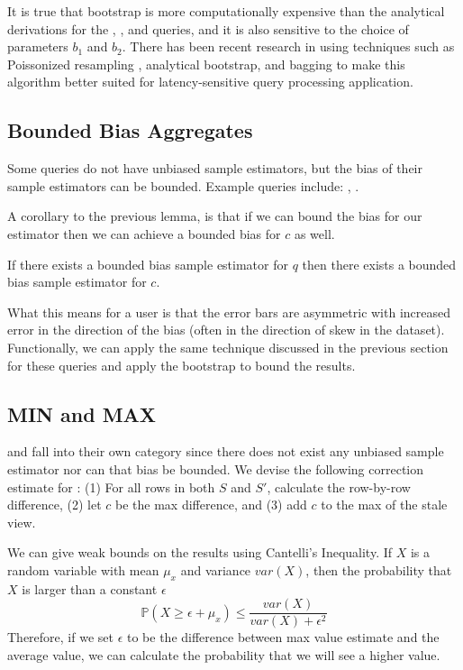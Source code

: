 It is true that bootstrap is more computationally expensive than the analytical derivations for the \sumfunc, \countfunc, and \avgfunc queries, and it is also sensitive to the choice of parameters $b_1$ and $b_2$.
There has been recent research in using techniques such as Poissonized resampling \cite{agarwalknowing}, analytical bootstrap\cite{DBLP:conf/sigmod/ZengGMZ14}, and bagging \cite{DBLP:conf/kdd/KleinerTASJ13} to make this algorithm better suited for latency-sensitive query processing application.

\subsection{Bounded Bias Aggregates}
Some queries do not have unbiased sample estimators, but the bias of their sample estimators can be bounded. Example queries include: \medfunc, \percfunc.

A corollary to the previous lemma, is that if we can bound the bias for our estimator then we can achieve a bounded bias for $c$ as well.
\begin{corollary}
If there exists a bounded bias sample estimator for $q$ then there exists a bounded bias sample estimator for $c$.
\end{corollary}

What this means for a user is that the error bars are asymmetric with increased error in the direction of the bias (often in the direction of skew in the dataset).
Functionally, we can apply the same technique discussed in the previous section for these queries and apply the bootstrap to bound the results. 

\subsection{MIN and MAX}
\minfunc and \maxfunc fall into their own category since there does not exist any unbiased sample estimator nor can that bias be bounded.
We devise the following correction estimate for \maxfunc: (1) For all rows in both $S$ and $S'$, calculate the row-by-row difference, (2) let $c$ be the max difference, and (3) add $c$ to the max of the stale view.

We can give weak bounds on the results using Cantelli's Inequality.
If $X$ is a random variable with mean $\mu_x$ and variance $var(X)$, then the probability that $X$ is larger than a constant $\epsilon$ 
\[
\mathbb{P}(X \ge \epsilon + \mu_x ) \le \frac{var(X)}{var(X) + \epsilon^2}
\]
Therefore, if we set $\epsilon$ to be the difference between max value estimate and the average value, we can calculate the probability that we will see a higher value. 


